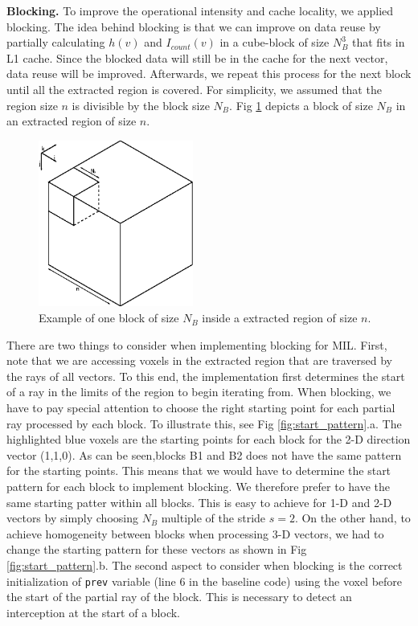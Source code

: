 \documentclass[letterpaper]{article}
\newcommand{\mypar}[1]{{\bf #1.}}
\begin{document}
\mypar{Blocking}
To improve the operational intensity and cache locality, we applied blocking. The idea behind blocking is that we can improve on data reuse by partially calculating $h(v)$ and $I_{count}(v)$ in a cube-block of size $N_B^3$ that fits in L1 cache. Since the blocked data will still be in the cache for the next vector, data reuse will be improved. Afterwards, we repeat this process for the next block until all the extracted region is covered. For simplicity, we assumed that the region size $n$ is divisible by the block size $N_B$. Fig \ref{fig:mil_blocking} depicts a block of size $N_B$ in an extracted region of size $n$. 


\begin{figure}[t]
    \centering
    \includegraphics[width=2in]{figs/mil_blocking.eps}
    \caption {Example of one block of size $N_B$ inside a extracted region of size $n$.}
    \label{fig:mil_blocking}
\end{figure}

There are two things to consider when implementing blocking for MIL. First, note that we are accessing voxels in the extracted region that are traversed by the rays of all vectors. To this end, the implementation first determines the start of a ray in the limits of the region to begin iterating from. When blocking, we have to pay special attention to choose the right starting point for each partial ray processed by each block. To illustrate this, see Fig \ref{fig:start_pattern}.a. The highlighted blue voxels are the starting points for each block for the 2-D direction vector (1,1,0). As can be seen,blocks B1 and B2 does not have the same pattern for the starting points. This means that we would have to determine the start pattern for each block to implement blocking. We therefore prefer to have the same starting patter within all blocks. This is easy to achieve for 1-D and 2-D vectors by simply choosing $N_B$ multiple of the stride $s=2$. On the other hand, to achieve homogeneity between blocks when processing 3-D vectors, we had to change the starting pattern for these vectors as shown in Fig \ref{fig:start_pattern}.b. The second aspect to consider when blocking is the correct initialization of \texttt{prev} variable (line 6 in the baseline code) using the voxel before the start of the partial ray of the block. This is necessary to detect an interception at the start of a block. 
\end{document}
